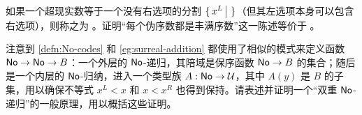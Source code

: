 \begin{ex}\label{ex:pseudo-ordinals}
  如果一个超现实数等于一个没有右选项的分割 $\{\,x^L\,\big|\,\,\}$（但其左选项本身可以包含右选项），则称之为 。证明“每个伪序数都是丰满序数”这一陈述等价于 \LEM{}。
\end{ex}

\begin{ex}\label{ex:double-No-recursion}
  注意到 \cref{defn:No-codes} 和 \cref{eg:surreal-addition} 都使用了相似的模式来定义函数 $\mathsf{No} \to \mathsf{No} \to B$：一个外层的 $\mathsf{No}$-递归，其陪域是保序函数 $\mathsf{No}\to B$ 的集合；随后是一个内层的 $\mathsf{No}$-归纳，进入一个类型族 $A:\mathsf{No}\to\mathcal{U}$，其中 $A(y)$ 是 $B$ 的子集，用以确保不等式 $x^L<x$ 和 $x<x^R$ 也得到保持。请表述并证明一个“双重 $\mathsf{No}$-递归”的一般原理，用以概括这些证明。
\end{ex}

%

